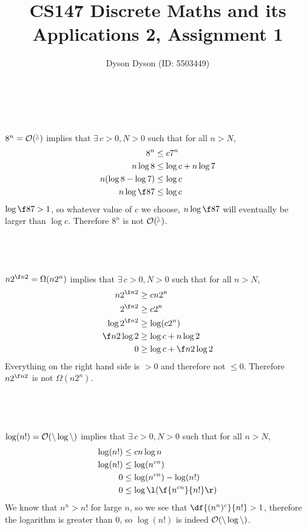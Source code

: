 \documentclass[a4paper]{article}
\title{CS147 Discrete Maths and its Applications 2, Assignment 1}
\author{Dyson Dyson (ID: 5503449)}
\date{}
\begin{document}
\maketitle

\setlength{\parindent}{0em}
\setlength{\parskip}{1em}


\subsection{~}

$8^n = \cal O(7^n)$ implies that $\exists\, c > 0, N > 0$ such that for all $n > N$, \begin{align*}
8^n &\le c 7^n\\
n \log 8 &\le \log c + n \log 7\\
n (\log 8 - \log 7) &\le \log c\\
n \log \f87 &\le \log c
\end{align*}
$\log \f87 > 1$, so whatever value of $c$ we choose, $n \log \f87$ will eventually be larger than $\log c$. Therefore $8^n$ is not $\cal O(7^n)$.

\subsection{~}

$n 2^{\f n2} = \Omega(n 2^n)$ implies that $\exists\, c > 0, N > 0$ such that for all $n > N$, \begin{align*}
n 2^{\f n2} &\ge c n 2^n\\
2^{\f n2} &\ge c 2^n\\
\log 2^{\f n2} &\ge \log (c 2^n)\\
\f n2 \log 2 &\ge \log c + n \log 2\\
0 &\ge \log c + \f n2 \log 2
\end{align*}
Everything on the right hand side is $>0$ and therefore not $\le 0$. Therefore $n 2^{\f n2}$ is not $\Omega(n 2^n)$.

\subsection{~}

$\log (n!) = \cal O(n \log n)$ implies that $\exists\, c > 0, N > 0$ such that for all $n > N$, \begin{align*}
\log (n!) &\le c n \log n\\
\log (n!) &\le \log(n^{cn})\\
0 &\le \log(n^{cn}) - \log(n!)\\
0 &\le \log\l(\f{n^{cn}}{n!}\r)
\end{align*}
We know that $n^n > n!$ for large $n$, so we see that $\df{(n^n)^c}{n!} > 1$, therefore the logarithm is greater than $0$, so $\log(n!)$ is indeed $\cal O(n \log n)$.
\end{document}
